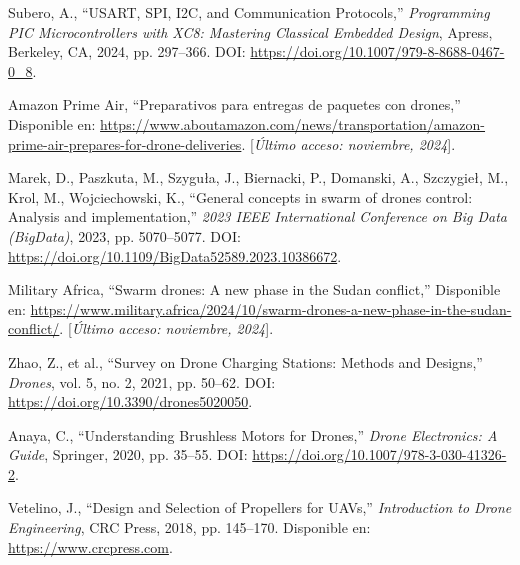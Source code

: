 \begin{thebibliography}{30}
    
  
   
   
    Subero, A., ``USART, SPI, I2C, and Communication Protocols,'' \textit{Programming PIC Microcontrollers with XC8: Mastering Classical Embedded Design}, Apress, Berkeley, CA, 2024, pp. 297--366. DOI: \url{https://doi.org/10.1007/979-8-8688-0467-0_8}.

    
   
    Amazon Prime Air, ``Preparativos para entregas de paquetes con drones,'' Disponible en: \url{https://www.aboutamazon.com/news/transportation/amazon-prime-air-prepares-for-drone-deliveries}. [\textit{Último acceso: noviembre, 2024}].
    
    Marek, D., Paszkuta, M., Szyguła, J., Biernacki, P., Domanski, A., Szczygieł, M., Krol, M., Wojciechowski, K., ``General concepts in swarm of drones control: Analysis and implementation,'' \textit{2023 IEEE International Conference on Big Data (BigData)}, 2023, pp. 5070--5077. DOI: \url{https://doi.org/10.1109/BigData52589.2023.10386672}.

    Military Africa, ``Swarm drones: A new phase in the Sudan conflict,'' Disponible en: \url{https://www.military.africa/2024/10/swarm-drones-a-new-phase-in-the-sudan-conflict/}. [\textit{Último acceso: noviembre, 2024}].

   
  
  
    Zhao, Z., et al., ``Survey on Drone Charging Stations: Methods and Designs,'' \textit{Drones}, vol. 5, no. 2, 2021, pp. 50--62. DOI: \url{https://doi.org/10.3390/drones5020050}.

    Anaya, C., ``Understanding Brushless Motors for Drones,'' \textit{Drone Electronics: A Guide}, Springer, 2020, pp. 35--55. DOI: \url{https://doi.org/10.1007/978-3-030-41326-2}.

    Vetelino, J., ``Design and Selection of Propellers for UAVs,'' \textit{Introduction to Drone Engineering}, CRC Press, 2018, pp. 145--170. Disponible en: \url{https://www.crcpress.com}.

   
    
    
   
  
   
   
    
    
   
  

\end{thebibliography}
